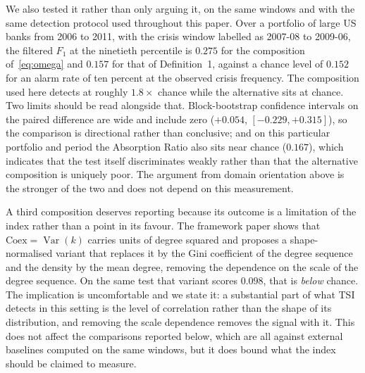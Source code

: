 \documentclass[11pt,a4paper]{article}
\begin{document}
We also tested it rather than only arguing it, on the same windows and with the
same detection protocol used throughout this paper. Over a portfolio of large
US banks from 2006 to 2011, with the crisis window labelled as 2007-08 to
2009-06, the filtered $F_1$ at the ninetieth percentile is $0.275$ for the
composition of~\eqref{eq:omega} and $0.157$ for that of Definition~1, against a
chance level of $0.152$ for an alarm rate of ten percent at the observed crisis
frequency. The composition used here detects at roughly $1.8\times$ chance while
the alternative sits at chance. Two limits should be read alongside that.
Block-bootstrap confidence intervals on the paired difference are wide and
include zero ($+0.054$, $[-0.229, +0.315]$), so the comparison is directional
rather than conclusive; and on this particular portfolio and period the
Absorption Ratio also sits near chance ($0.167$), which indicates that the test
itself discriminates weakly rather than that the alternative composition is
uniquely poor. The argument from domain orientation above is the stronger of the
two and does not depend on this measurement.

A third composition deserves reporting because its outcome is a limitation of
the index rather than a point in its favour. The framework paper shows that
$\mathrm{Coex} = \operatorname{Var}(k)$ carries units of degree squared and
proposes a shape-normalised variant that replaces it by the Gini coefficient of
the degree sequence and the density by the mean degree, removing the dependence
on the scale of the degree sequence. On the same test that variant scores
$0.098$, that is \emph{below} chance. The implication is uncomfortable and we
state it: a substantial part of what TSI detects in this setting is the
level of correlation rather than the shape of its distribution, and removing the
scale dependence removes the signal with it. This does not affect the
comparisons reported below, which are all against external baselines computed on
the same windows, but it does bound what the index should be claimed to measure.
\end{document}
